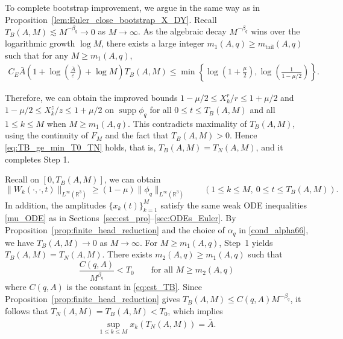 \documentclass[reqno,11pt]{amsart}
\newcommand{\supp}{\operatorname{supp}}
\newcommand{\R}{\mathbb{R}}
\begin{document}
\medskip
To complete bootstrap improvement, we argue in the same way as in Proposition~\ref{lem:Euler_close_bootstrap_X_DY}.
Recall $T_B(A,M)\lesssim M^{-\beta_q}\to 0$ as $M\to\infty$. As the algebraic decay $M^{-\beta_q}$ wins over the logarithmic growth $\log M$, there exists a large integer $m_1(A,q)\geq m_{\mathrm{tail}}(A,q)$ such that for any $M\geq m_1(A,q)$,
    \begin{align}
    \label{eq:m_1_def2}
        C_E \bar A 
        \left(
        1+ \log \left( \frac{\bar A}{\varepsilon} \right) 
        + \log M
        \right) T_B(A,M)
        \leq
        \min \left\{
        \log \left( 1+\frac{\mu}{2}\right),
        \log  \left( \frac{1}{1-\mu/2}\right)
        \right\}.
    \end{align}


Therefore, we can obtain the improved bounds
$1-\mu/2\le X_k^r/r\le 1+\mu/2$ and $1-\mu/2\le X_k^z/z\le 1+\mu/2$ on $\supp\phi_q$ for all
$0\le t\le T_B(A,M)$ and all $1\le k\le M$ when $M\geq m_1(A,q)$. This contradicts maximality of $T_B(A,M)$, using the continuity
of $F_M$ and the fact that $T_B(A,M)>0$. Hence \eqref{eq:TB_ge_min_T0_TN} holds, that is, $T_B(A,M)=T_N(A,M)$, and it completes Step 1.




\medskip
{}
 Recall on
$[0,T_B(A,M)]$, we can obtain 
\begin{equation}\label{eq:Wk_lower_infty_layers}
\|W_k(\cdot,\cdot,t)\|_{L^\infty(\R^3)}\ge (1-\mu)\|\phi_q\|_{L^\infty(\R^3)}
\qquad (1\le k\le M,\ 0\le t\le T_B(A,M)).
\end{equation}
In addition, the amplitudes $\{x_k(t)\}_{k=1}^M$
satisfy the same weak ODE inequalities \eqref{mu_ODE} as in Sections~\ref{sec:est_pro}--\ref{sec:ODEs_Euler}.
By Proposition~\ref{prop:finite_head_reduction} and the choice of $\alpha_q$ in \eqref{cond_alpha66}, we have $T_B(A,M)\to0$ as
$M\to\infty$. For $M\geq m_1(A,q)$, Step~1 yields
$T_B(A,M)=T_N(A,M)$.
There exists  $m_2(A,q) \geq m_1(A,q)$ such that 
\[
\frac{C(q,A)}{M^{\beta_q}}<T_0 \qquad \text{for all } M\geq m_2(A,q)
\]
where $C(q,A)$ is the constant in \eqref{eq:est_TB}.
Since Proposition~\ref{prop:finite_head_reduction} gives
$T_B(A,M)\le C(q,A) M^{-\beta_q}$, it follows that $T_N(A,M)=T_B(A,M)<T_0$, which implies
\begin{align*}
    \sup_{1\leq k \leq M  } x_k (T_N(A,M)) = \bar A.
\end{align*}
\end{document}
